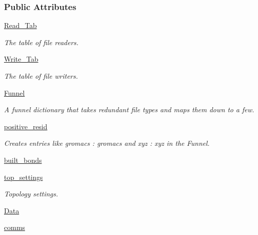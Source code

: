 \subsubsection*{Public Attributes}
\begin{DoxyCompactItemize}
\item 
\hyperlink{classsrc_1_1molecule_1_1Molecule_a809f63082b7a39e0f787fc455dd18516}{Read\+\_\+\+Tab}
\begin{DoxyCompactList}\small\item\em The table of file readers. \end{DoxyCompactList}\item 
\hyperlink{classsrc_1_1molecule_1_1Molecule_a0c2c1e8f6951f338e8ce2220a5d12045}{Write\+\_\+\+Tab}
\begin{DoxyCompactList}\small\item\em The table of file writers. \end{DoxyCompactList}\item 
\hyperlink{classsrc_1_1molecule_1_1Molecule_a56e223f4d0b5bf391e7d038b36d335d8}{Funnel}
\begin{DoxyCompactList}\small\item\em A funnel dictionary that takes redundant file types and maps them down to a few. \end{DoxyCompactList}\item 
\hyperlink{classsrc_1_1molecule_1_1Molecule_a16ef842ad2eb3048d82d2303639e56e0}{positive\+\_\+resid}
\begin{DoxyCompactList}\small\item\em Creates entries like \textquotesingle{}gromacs\textquotesingle{} \+: \textquotesingle{}gromacs\textquotesingle{} and \textquotesingle{}xyz\textquotesingle{} \+: \textquotesingle{}xyz\textquotesingle{} in the Funnel. \end{DoxyCompactList}\item 
\hyperlink{classsrc_1_1molecule_1_1Molecule_ae084bae0a4a0204c4d92fff5cbdbeee5}{built\+\_\+bonds}
\item 
\hyperlink{classsrc_1_1molecule_1_1Molecule_afd7595ccf68f4fc41c728a5071d0a0b9}{top\+\_\+settings}
\begin{DoxyCompactList}\small\item\em Topology settings. \end{DoxyCompactList}\item 
\hyperlink{classsrc_1_1molecule_1_1Molecule_a0270df3966f56e55abb73ab7de5a3e77}{Data}
\item 
\hyperlink{classsrc_1_1molecule_1_1Molecule_a36609ce51ce26648178b39f22343f085}{comms}

\end{DoxyCompactItemize}
